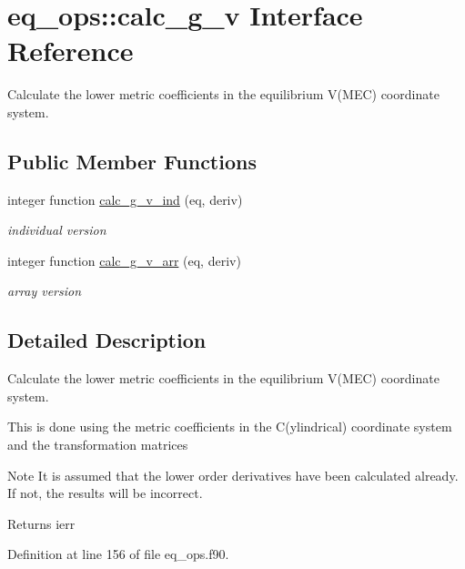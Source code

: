 \hypertarget{interfaceeq__ops_1_1calc__g__v}{}\section{eq\+\_\+ops\+:\+:calc\+\_\+g\+\_\+v Interface Reference}
\label{interfaceeq__ops_1_1calc__g__v}


Calculate the lower metric coefficients in the equilibrium V(\+M\+E\+C) coordinate system.  


\subsection*{Public Member Functions}
\begin{DoxyCompactItemize}
\item 
integer function \hyperlink{interfaceeq__ops_1_1calc__g__v_a16fcebfd6f70491ec6d66534cd50c7a4}{calc\+\_\+g\+\_\+v\+\_\+ind} (eq, deriv)
\begin{DoxyCompactList}\small\item\em individual version \end{DoxyCompactList}\item 
integer function \hyperlink{interfaceeq__ops_1_1calc__g__v_a7657be969a8a4627c65bbac534d89771}{calc\+\_\+g\+\_\+v\+\_\+arr} (eq, deriv)
\begin{DoxyCompactList}\small\item\em array version \end{DoxyCompactList}\end{DoxyCompactItemize}


\subsection{Detailed Description}
Calculate the lower metric coefficients in the equilibrium V(\+M\+E\+C) coordinate system. 

This is done using the metric coefficients in the C(ylindrical) coordinate system and the transformation matrices

\begin{DoxyNote}{Note}
It is assumed that the lower order derivatives have been calculated already. If not, the results will be incorrect.
\end{DoxyNote}
\begin{DoxyReturn}{Returns}
ierr 
\end{DoxyReturn}


Definition at line 156 of file eq\+\_\+ops.\+f90.



